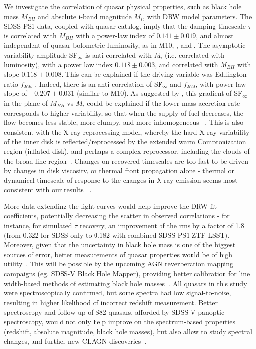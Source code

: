 \documentclass[twocolumn]{aastex62}
\begin{document}
We investigate the correlation of quasar physical properties, such as black hole mass $M_{BH}$ and absolute i-band magnitude $M_{i}$,  with DRW model parameters. The SDSS-PS1 data, coupled with \citet{shen2011} quasar catalog, imply that the damping timescale $\tau$  is correlated with $M_{BH}$ with a power-law index of $0.141 \pm 0.019$, and almost independent of quasar bolometric luminosity, as in M10, \citet{wilhite2008}, and \citet{vandenberk2004}. The asymptotic variability amplitude SF$_{\infty}$ is anti-correlated with $M_{i}$ (i.e. correlated with luminosity), with a power law index $0.118\pm0.003$, and correlated with $M_{BH}$ with slope $0.118\pm 0.008$. This can be explained if the driving variable was Eddington ratio $f_{Edd}$ \citep{wilhite2008}. Indeed, there is an anti-correlation of SF$_{\infty}$ and $f_{Edd}$, with power law slope of $-0.207 \pm 0.031$ (similar to M10).  As suggested by \citet{kubota2018}, this gradient of SF$_{\infty}$ in the plane of $M_{BH}$ vs $M_{i}$ could be explained if the lower mass accretion rate corresponds to higher variability, so that when the supply of fuel decreases, the flow becomes less stable, more clumpy, and more inhomogeneous ~\citep{rakshit2017, kokubo2015, dexter2011}.  This is also consistent with the X-ray reprocessing model, whereby the hard X-ray variability of the inner disk is reflected/reprocessed by the extended warm Comptonization region (inflated disk), and perhaps a complex reprocessor, including the clouds of the broad line region~\citep{kubota2018, panda2019b}. Changes on recovered timescales are too fast to be driven by changes in disk viscosity, or thermal front propagation alone - thermal or dynamical timescale of response to the changes in X-ray emission seems most consistent with our results ~\citep{stern2018}.


More data extending the light curves would help improve the DRW fit coefficients, potentially decreasing the scatter in observed correlations - for instance, for simulated $\tau$ recovery, an improvement of the rms by a factor of 1.8 (from 0.322 for SDSS only to 0.182 with combined SDSS-PS1-ZTF-LSST). Moreover, given that the uncertainty in black hole mass is one of the biggest sources of error, better measurements of quasar properties would be of high utility~\citep{shen2011}.  This will be possible by the upcoming AGN reverberation mapping campaigns (eg. SDSS-V Black Hole Mapper), providing better calibration for line width-based methods of estimating black hole masses~\citep{kollmeier2017}. All quasars in this study were spectroscopically confirmed, but some spectra had low signal-to-noise, resulting in higher likelihood of incorrect redshift measurement. Better spectroscopy and follow up of S82 quasars, afforded by SDSS-V panoptic spectroscopy, would not only help improve on the spectrum-based  properties (redshift, absolute magnitude, black hole masses), but also allow to study spectral changes, and further new CLAGN discoveries~\citep{macleod2019}. 
\end{document}
